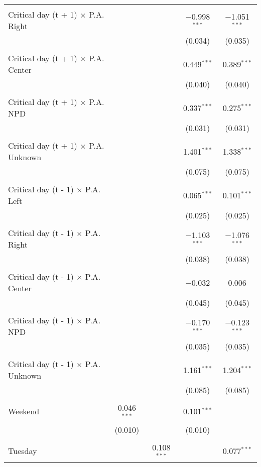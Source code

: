 \documentclass[
]{article}
\begin{document}
\begin{table}[!htbp]
{\begin{tabular}{@{\extracolsep{5pt}}lcccc}
  & & & & \\ 
 Critical day (t + 1) $\times$ P.A. Right &  &  & $-$0.998$^{***}$ & $-$1.051$^{***}$ \\ 
  &  &  & (0.034) & (0.035) \\ 
  & & & & \\ 
 Critical day (t + 1) $\times$ P.A. Center &  &  & 0.449$^{***}$ & 0.389$^{***}$ \\ 
  &  &  & (0.040) & (0.040) \\ 
  & & & & \\ 
 Critical day (t + 1) $\times$ P.A. NPD &  &  & 0.337$^{***}$ & 0.275$^{***}$ \\ 
  &  &  & (0.031) & (0.031) \\ 
  & & & & \\ 
 Critical day (t + 1) $\times$ P.A. Unknown &  &  & 1.401$^{***}$ & 1.338$^{***}$ \\ 
  &  &  & (0.075) & (0.075) \\ 
  & & & & \\ 
 Critical day (t - 1) $\times$ P.A. Left &  &  & 0.065$^{***}$ & 0.101$^{***}$ \\ 
  &  &  & (0.025) & (0.025) \\ 
  & & & & \\ 
 Critical day (t - 1) $\times$ P.A. Right &  &  & $-$1.103$^{***}$ & $-$1.076$^{***}$ \\ 
  &  &  & (0.038) & (0.038) \\ 
  & & & & \\ 
 Critical day (t - 1) $\times$ P.A. Center &  &  & $-$0.032 & 0.006 \\ 
  &  &  & (0.045) & (0.045) \\ 
  & & & & \\ 
 Critical day (t - 1) $\times$ P.A. NPD &  &  & $-$0.170$^{***}$ & $-$0.123$^{***}$ \\ 
  &  &  & (0.035) & (0.035) \\ 
  & & & & \\ 
 Critical day (t - 1) $\times$ P.A. Unknown &  &  & 1.161$^{***}$ & 1.204$^{***}$ \\ 
  &  &  & (0.085) & (0.085) \\ 
  & & & & \\ 
 Weekend & 0.046$^{***}$ &  & 0.101$^{***}$ &  \\ 
  & (0.010) &  & (0.010) &  \\ 
  & & & & \\ 
 Tuesday &  & 0.108$^{***}$ &  & 0.077$^{***}$ \\ 

\end{tabular}}
\end{table}
\end{document}
